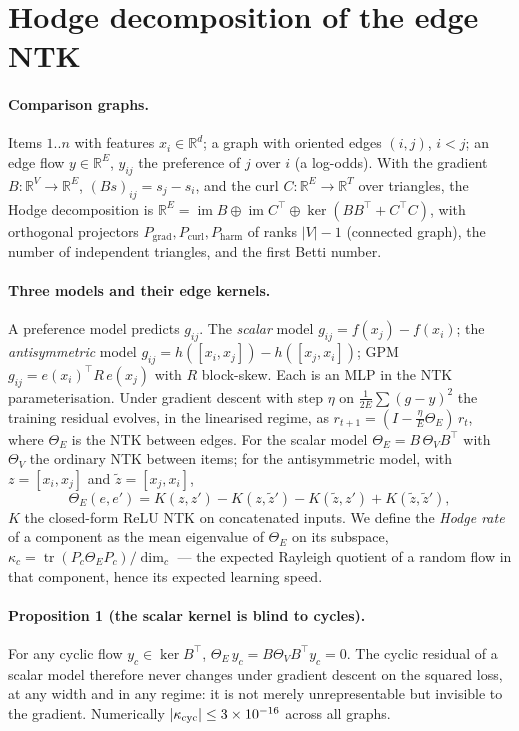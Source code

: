 \section{Hodge decomposition of the edge NTK}
\label{sec:theory}

\paragraph{Comparison graphs.} Items $1..n$ with features $x_i \in
\mathbb{R}^d$; a graph with oriented edges $(i,j)$, $i<j$; an edge flow $y
\in \mathbb{R}^E$, $y_{ij}$ the preference of $j$ over $i$ (a log-odds). With
the gradient $B:\mathbb{R}^V\to\mathbb{R}^E$, $(Bs)_{ij}=s_j-s_i$, and the
curl $C:\mathbb{R}^E\to\mathbb{R}^T$ over triangles, the Hodge decomposition
is $\mathbb{R}^E = \operatorname{im}B \oplus \operatorname{im}C^\top \oplus
\ker(BB^\top + C^\top C)$, with orthogonal projectors $P_{\text{grad}},
P_{\text{curl}}, P_{\text{harm}}$ of ranks $|V|-1$ (connected graph), the
number of independent triangles, and the first Betti number.

\paragraph{Three models and their edge kernels.} A preference model predicts
$g_{ij}$. The \emph{scalar} model $g_{ij}=f(x_j)-f(x_i)$; the
\emph{antisymmetric} model $g_{ij} = h([x_i,x_j]) - h([x_j,x_i])$; GPM $g_{ij}
= e(x_i)^\top R\, e(x_j)$ with $R$ block-skew. Each is an MLP in the NTK
parameterisation. Under gradient descent with step $\eta$ on
$\tfrac{1}{2E}\sum(g-y)^2$ the training residual evolves, in the linearised
regime, as $r_{t+1} = (I-\tfrac{\eta}{E}\Theta_E)\,r_t$, where $\Theta_E$ is
the NTK between edges. For the scalar model $\Theta_E = B\,\Theta_V B^\top$
with $\Theta_V$ the ordinary NTK between items; for the antisymmetric model,
with $z=[x_i,x_j]$ and $\tilde z=[x_j,x_i]$,
\begin{equation}
\Theta_E(e,e') = K(z,z') - K(z,\tilde z') - K(\tilde z,z') + K(\tilde z,\tilde z'),
\end{equation}
$K$ the closed-form ReLU NTK \cite{jacot2018neural} on concatenated inputs.
We define the \emph{Hodge rate} of a component as the mean eigenvalue of
$\Theta_E$ on its subspace, $\kappa_c = \operatorname{tr}(P_c\Theta_E P_c)
/ \dim_c$ --- the expected Rayleigh quotient of a random flow in that
component, hence its expected learning speed.

\paragraph{Proposition 1 (the scalar kernel is blind to cycles).} For any
cyclic flow $y_c \in \ker B^\top$, $\Theta_E\,y_c = B\Theta_V B^\top y_c = 0$.
The cyclic residual of a scalar model therefore never changes under gradient
descent on the squared loss, at any width and in any regime: it is not merely
unrepresentable but invisible to the gradient. Numerically $|\kappa_{\text{cyc}}|
\le 3\times10^{-16}$ across all graphs.

